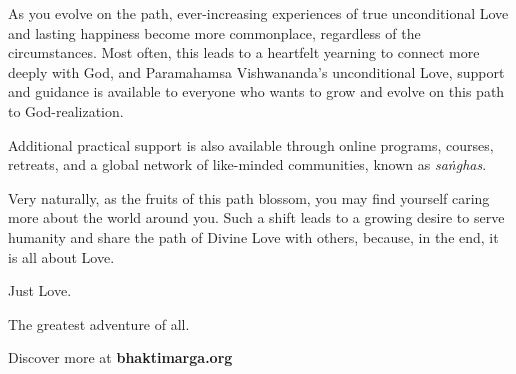 As you evolve on the path, ever-increasing experiences of true unconditional Love and lasting happiness become more commonplace, regardless of the circumstances. Most often, this leads to a heartfelt yearning to connect more deeply with God, and Paramahamsa Vishwananda’s unconditional Love, support and guidance is available to everyone who wants to grow and evolve on this path to God-realization.


Additional practical support is also available through online programs, courses, retreats, and a global network of like-minded communities, known as \textit{saṅghas}.

Very naturally, as the fruits of this path blossom, you may find yourself caring more about the world around you. Such a shift leads to a growing desire to serve humanity and share the path of Divine Love with others, because, in the end, it is all about Love.

\noindent Just Love.

\noindent The greatest adventure of all.


\bigskip
\bigskip
{}

\noindent Discover more at \textbf{bhaktimarga.org}